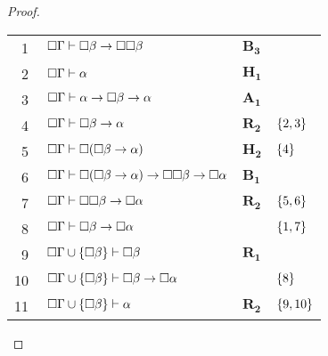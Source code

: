 \begin{tcolorbox}[enhanced jigsaw, breakable, sharp corners, colframe=black, colback=white, boxrule=0.5pt, left=1.5mm, right=1.5mm, top=1.5mm, bottom=1.5mm]
\begin{theorem}
\begin{proof}
            \vspace{0.5\baselineskip}
            \footnotesize
            \setlength{\rowskip}{0.5\baselineskip}
            \begin{xltabular}{\textwidth}{r | X l l}
                \scriptsize{\phantom{0}1}\phantom{ } & $\ \nec\Gamma\vdash\nec\beta\to\nec\nec\beta$                             & $\hyperref[modal.axiom.modal.3]{\mathbf{B_3}}$ & \\[\rowskip]
                \scriptsize{\phantom{0}2}\phantom{ } & $\ \nec\Gamma\vdash\alpha$                                                & $\mathbf{H_1}$\phantom{1}                      & \\[\rowskip]
                \scriptsize{\phantom{0}3}\phantom{ } & $\ \nec\Gamma\vdash\alpha\to\nec\beta\to\alpha$                           & $\hyperref[modal.axiom.1]{\mathbf{A_1}}$       & \\[\rowskip]
                \scriptsize{\phantom{0}4}\phantom{ } & $\ \nec\Gamma\vdash\nec\beta\to\alpha$                                    & $\hyperref[modal.rule.2]{\mathbf{R_2}}$        & $\left\{2,3\right\}$\\[\rowskip]
                \scriptsize{\phantom{0}5}\phantom{ } & $\ \nec\Gamma\vdash\nec(\nec\beta\to\alpha)$                              & $\mathbf{H_2}$                                 & $\left\{4\right\}$\\
                \scriptsize{\phantom{0}6}\phantom{ } & $\ \nec\Gamma\vdash\nec(\nec\beta\to\alpha)\to\nec\nec\beta\to\nec\alpha$ & $\hyperref[modal.axiom.modal.1]{\mathbf{B_1}}$ & \\[\rowskip]
                \scriptsize{\phantom{0}7}\phantom{ } & $\ \nec\Gamma\vdash\nec\nec\beta\to\nec\alpha$                            & $\hyperref[modal.rule.2]{\mathbf{R_2}}$        & $\left\{5,6\right\}$\\[\rowskip]
                \scriptsize{\phantom{0}8}\phantom{ } & $\ \nec\Gamma\vdash\nec\beta\to\nec\alpha$                                &                          & $\left\{1,7\right\}$\\[\rowskip]
                \scriptsize{\phantom{0}9}\phantom{ } & $\ \nec\Gamma\cup\set{\nec\beta}\vdash\nec\beta$                          & $\hyperref[modal.rule.2]{\mathbf{R_1}}$        & \\[\rowskip]
                \scriptsize{10}\phantom{ }           & $\ \nec\Gamma\cup\set{\nec\beta}\vdash\nec\beta\to\nec\alpha$             &                            & $\left\{8\right\}$\\[\rowskip]
                \scriptsize{11}\phantom{ }           & $\ \nec\Gamma\cup\set{\nec\beta}\vdash\alpha$                             & $\hyperref[modal.rule.2]{\mathbf{R_2}}$  & $\left\{9,10\right\}$
            \end{xltabular}
            \normalsize


\end{proof}
\end{theorem}
\end{tcolorbox}
